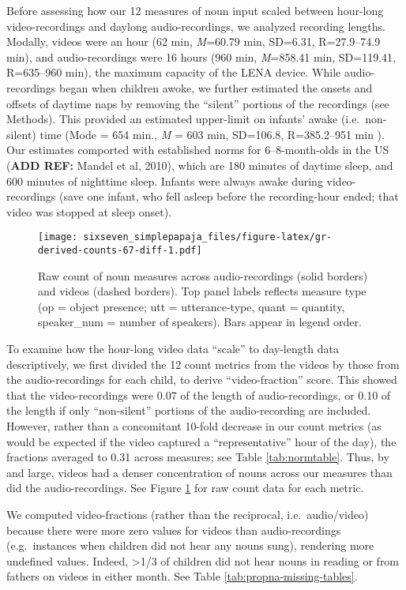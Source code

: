 \documentclass[floatsintext,man]{apa6}
\theoremstyle{definition}
\theoremstyle{definition}
\theoremstyle{definition}
\theoremstyle{remark}
\begin{document}
Before assessing how our 12 measures of noun input scaled between
hour-long video-recordings and daylong audio-recordings, we analyzed
recording lengths. Modally, videos were an hour (62 min, \emph{M}=60.79
min, SD=6.31, R=27.9--74.9 min), and audio-recordings were 16 hours (960
min, \emph{M}=858.41 min, SD=119.41, R=635--960 min), the maximum
capacity of the LENA device. While audio-recordings began when children
awoke, we further estimated the onsets and offsets of daytime naps by
removing the \enquote{silent} portions of the recordings (see Methods).
This provided an estimated upper-limit on infants' awake
(i.e.~non-silent) time (Mode = 654 min., \emph{M} = 603 min, SD=106.8,
R=385.2--951 min ). Our estimates comported with established norms for
6--8-month-olds in the US (\textbf{ADD REF:} Mandel et al, 2010), which
are 180 minutes of daytime sleep, and 600 minutes of nighttime sleep.
Infants were always awake during video-recordings (save one infant, who
fell asleep before the recording-hour ended; that video was stopped at
sleep onset).

\begin{figure}
\centering
\texttt{[image: sixseven\_simplepapaja\_files/figure-latex/gr-derived-counts-67-diff-1.pdf]}
\caption{\label{fig:gr-derived-counts-67-diff}Raw count of noun measures
across audio-recordings (solid borders) and videos (dashed borders). Top
panel labels reflects measure type (op = object presence; utt =
utterance-type, quant = quantity, speaker\_num = number of speakers).
Bars appear in legend order.}
\end{figure}

To examine how the hour-long video data \enquote{scale} to day-length
data descriptively, we first divided the 12 count metrics from the
videos by those from the audio-recordings for each child, to derive
\enquote{video-fraction} score. This showed that the video-recordings
were 0.07 of the length of audio-recordings, or 0.10 of the length if
only \enquote{non-silent} portions of the audio-recording are included.
However, rather than a concomitant 10-fold decrease in our count metrics
(as would be expected if the video captured a \enquote{representative}
hour of the day), the fractions averaged to 0.31 across measures; see
Table \ref{tab:normtable}. Thus, by and large, videos had a denser
concentration of nouns across our measures than did the
audio-recordings. See Figure \ref{fig:gr-derived-counts-67-diff} for raw
count data for each metric.

We computed video-fractions (rather than the reciprocal,
i.e.~audio/video) because there were more zero values for videos than
audio-recordings (e.g.~instances when children did not hear any nouns
sung), rendering more undefined values. Indeed, \textgreater{}1/3 of
children did not hear nouns in reading or from fathers on videos in
either month. See Table \ref{tab:propna-missing-tables}.
\end{document}
